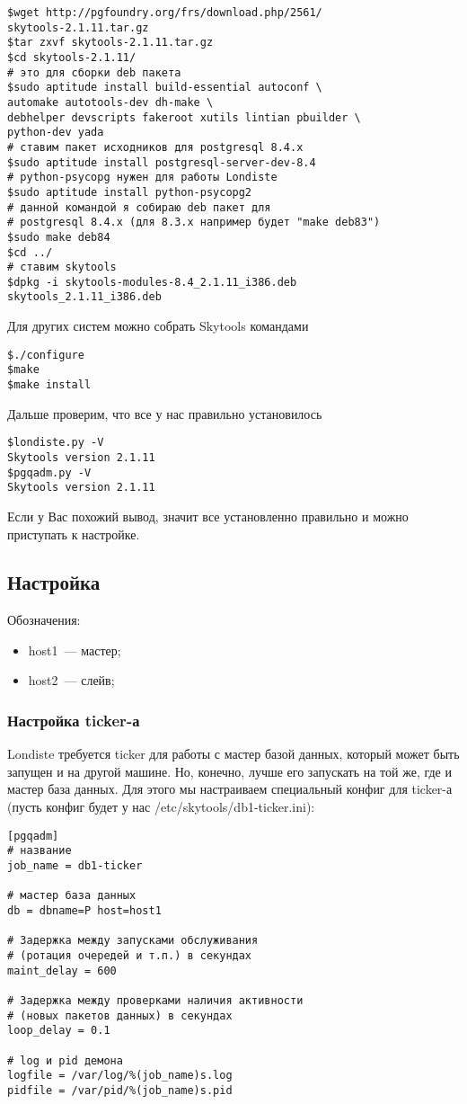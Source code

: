 \begin{verbatim}
$wget http://pgfoundry.org/frs/download.php/2561/
skytools-2.1.11.tar.gz
$tar zxvf skytools-2.1.11.tar.gz
$cd skytools-2.1.11/
# это для сборки deb пакета
$sudo aptitude install build-essential autoconf \ 
automake autotools-dev dh-make \ 
debhelper devscripts fakeroot xutils lintian pbuilder \
python-dev yada
# ставим пакет исходников для postgresql 8.4.x
$sudo aptitude install postgresql-server-dev-8.4
# python-psycopg нужен для работы Londiste
$sudo aptitude install python-psycopg2
# данной командой я собираю deb пакет для 
# postgresql 8.4.x (для 8.3.x например будет "make deb83")
$sudo make deb84
$cd ../
# ставим skytools
$dpkg -i skytools-modules-8.4_2.1.11_i386.deb 
skytools_2.1.11_i386.deb
\end{verbatim}

Для других систем можно собрать Skytools командами 

\begin{verbatim}
$./configure
$make
$make install
\end{verbatim}

Дальше проверим, что все у нас правильно установилось
\begin{verbatim}
$londiste.py -V
Skytools version 2.1.11
$pgqadm.py -V
Skytools version 2.1.11
\end{verbatim}

Если у Вас похожий вывод, значит все установленно правильно и можно приступать к настройке.


\subsection{Настройка}
Обозначения: 
\begin{itemize}
\item host1~--- мастер; 
\item host2~--- слейв;
\end{itemize}


\subsubsection{Настройка ticker-а}
Londiste требуется ticker для работы с мастер базой данных, который может быть запущен и на другой машине. 
Но, конечно, лучше его запускать на той же, где и мастер база данных. Для этого мы настраиваем специальный 
конфиг для ticker-а (пусть конфиг будет у нас /etc/skytools/db1-ticker.ini):
\begin{verbatim}
[pgqadm]
# название
job_name = db1-ticker

# мастер база данных 
db = dbname=P host=host1 

# Задержка между запусками обслуживания 
# (ротация очередей и т.п.) в секундах
maint_delay = 600

# Задержка между проверками наличия активности 
# (новых пакетов данных) в секундах
loop_delay = 0.1

# log и pid демона
logfile = /var/log/%(job_name)s.log
pidfile = /var/pid/%(job_name)s.pid
\end{verbatim}

